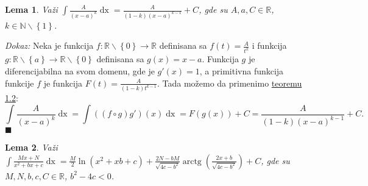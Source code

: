 \documentclass{article}
\newtheorem{lema}{Lema}[section]
\DeclareMathOperator{\arctg}{arctg}
\DeclareMathOperator{\dx}{dx}
\begin{document}
\begin{lemabox}
    \label{lema_1.2}
    \begin{lema}
        Važi $\displaystyle\int \frac{A}{\left(x-a\right)^k}\dx=\frac{A}{\left(1-k\right)\left(x-a\right)^{k-1}}+ C$, gde su $A,a,C\in \mathbb{R}$, $k\in\mathbb{N}\backslash\left\{1\right\}$.
    \end{lema}
\end{lemabox}

\textit{Dokaz:} Neka je funkcija $f:\mathbb{R}\backslash\left\{0\right\}\longrightarrow\mathbb{R}$ definisana sa
$f\left(t\right)=\frac{A}{t^k}$ i funkcija $g:\mathbb{R}\backslash\left\{a\right\}\longrightarrow\mathbb{R}\backslash\left\{0\right\}$
definisana sa $g\left(x\right)=x-a$. Funkcija $g$ je diferencijabilna na svom domenu, gde je $g'\left(x\right)=1$, a primitivna funkcija
funkcije $f$ je funkcija $F\left(t\right)=\frac{A}{\left(1-k\right)t^{k-1}}$. Tada možemo da primenimo \hyperref[teorema_1.2]{teoremu 1.2}:
$$\int \frac{A}{\left(x-a\right)^k}\dx = \int \left(\left(f\circ g\right) g'\right)\left(x\right)\dx = F\left(g\left(x\right)\right) + C= \frac{A}{\left(1-k\right)\left(x-a\right)^{k-1}}+ C.$$
\null\hfill$\blacksquare$\par

\begin{lemabox}
    \label{lema_1.3}
    \begin{lema}
        Važi $\displaystyle\int \frac{Mx+N}{x^2+bx+c}\dx= \frac{M}{2}\ln\left(x^2+xb+c\right)+\frac{2N-bM}{\sqrt{4c-b^2}}\arctg\left({\frac{2x+b}{\sqrt{4c-b^2}}}\right)+ C$, gde su $M,N,b,c,C\in\mathbb{R}$, $b^2 - 4c < 0$.
    \end{lema}
\end{lemabox}
\end{document}
